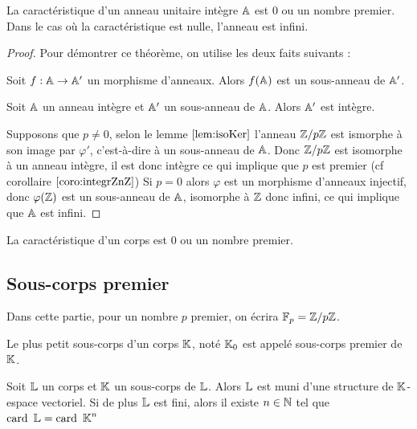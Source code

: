 \begin{thm}
\label{thm:caracIntegre}
La caractéristique d'un anneau unitaire intègre $\mathbb{A}$ est 0 ou un nombre premier. 
Dans le cas où la caractéristique est nulle, l'anneau est infini.
\end{thm}

\begin{proof}
Pour démontrer ce théorème, on utilise les deux faits suivants :

\begin{fait}
Soit $f: \mathbb{A} \to \mathbb{A}'$ un morphisme d'anneaux. Alors $f(\mathbb{A})$ est un sous-anneau de $\mathbb{A}'$.
\end{fait}

\begin{fait}
Soit $\mathbb{A}$ un anneau intègre et $\mathbb{A}'$ un sous-anneau de $\mathbb{A}$. Alors $\mathbb{A}'$ est intègre.
\end{fait}

Supposons que $p \neq 0$, selon le lemme $\ref{lem:isoKer}$ l'anneau $\mathbb{Z}/p\mathbb{Z}$ est ismorphe à son image par $\varphi'$,
c'est-à-dire à un sous-anneau de $\mathbb{A}$. Donc $\mathbb{Z}/p\mathbb{Z}$ est isomorphe à un anneau intègre, il est donc intègre 
ce qui implique que $p$ est premier (cf corollaire $\ref{coro:integrZnZ}$) \newline
Si $p=0$ alors $\varphi$ est un morphisme d'anneaux injectif, 
donc $\varphi(\mathbb{Z})$ est un sous-anneau de $\mathbb{A}$, isomorphe à $\mathbb{Z}$ donc infini, ce qui implique que $\mathbb{A}$ est infini.
\end{proof}

\begin{coro}
La caractéristique d'un corps est 0 ou un nombre premier.
\end{coro}

\subsection{Sous-corps premier}

Dans cette partie, pour un nombre $p$ premier, on écrira $\mathbb{F}_p = \mathbb{Z} / p\mathbb{Z}$.

\begin{defn}
Le plus petit sous-corps d'un corps $\mathbb{K}$, noté $\mathbb{K}_0$ est appelé sous-corps premier de $\mathbb{K}$.
\end{defn}

\begin{lem}
\label{lem:kev}
Soit $\mathbb{L}$ un corps et $\mathbb{K}$ un sous-corps de $\mathbb{L}$. Alors $\mathbb{L}$ est muni d'une structure de $\mathbb{K}$-espace vectoriel.
Si de plus $\mathbb{L}$ est fini, alors il existe $n \in \mathbb{N}$ tel que $\operatorname{card}{~\mathbb{L}} = \operatorname{card}{~\mathbb{K}}^n$
\end{lem}

